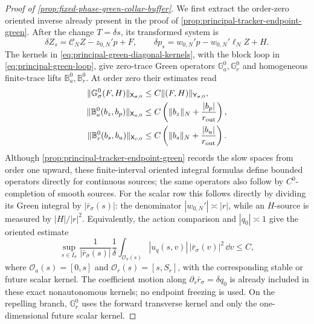 \begin{proof}[Proof of
\cref{prop:fixed-phase-green-collar-buffer}]
We first extract the order-zero oriented inverse already present in the proof
of \cref{prop:principal-tracker-endpoint-green}.  After the change
\(T=\delta s\), its transformed system is
\begin{equation}
 \delta Z_s=\mathcal C_NZ-z_{0,N}'p+F,\qquad
 \delta p_s=w_{0,N}'p-w_{0,N}'\ell_NZ+H.           \label{eq:fixed-phase-principal-s-system}
\end{equation}
The kernels in
\cref{eq:principal-green-diagonal-kernels}, with the block loop in
\cref{eq:principal-green-loop}, give zero-trace Green operators
\(\mathbb G_a^0,\mathbb G_r^0\) and homogeneous finite-trace lifts
\(\mathbb B_a^0,\mathbb B_r^0\).  At order zero their estimates read
\begin{align}
 \|\mathbb G_\sigma^0(F,H)\|_{\mathsf X_{\sigma,0}}
 &\le C\|(F,H)\|_{\mathsf Y_{\sigma,0}},\notag\\
 \|\mathbb B_a^0(b_z,b_p)\|_{\mathsf X_{a,0}}
 &\le C\left(\|b_z\|_N+\frac{|b_p|}{r_{\rm out}}\right),\notag\\
 \|\mathbb B_r^0(b_s,b_u)\|_{\mathsf X_{r,0}}
 &\le C\left(\|b_s\|_N+\frac{|b_u|}{r_{\rm out}}\right).    \label{eq:fixed-phase-principal-C0-bound}
\end{align}
Although \cref{prop:principal-tracker-endpoint-green} records the slow
spaces from order one upward, these finite-interval oriented integral
formulas define bounded operators directly for continuous sources; the same
operators also follow by \(C^0\)-completion of smooth sources.
For the scalar row this follows directly by dividing its Green integral by
\(|\bar r_\sigma(s)|\): the denominator
\(|w_{0,N}'|\asymp|r|\), while an \(H\)-source is measured by
\(|H|/|r|^2\).  Equivalently, the action comparison and
\(|q_0|\asymp1\) give the oriented estimate
\begin{equation}
 \sup_{s\in I_\sigma}\frac1{|\bar r_\sigma(s)|}
 \frac1\delta\int_{\mathcal O_\sigma(s)}
 |u_q(s,v)|\,|\bar r_\sigma(v)|^2\,\dd v\le C,    \label{eq:fixed-phase-moving-scalar-weight}
\end{equation}
where \(\mathcal O_a(s)=[0,s]\) and
\(\mathcal O_r(s)=[s,S_r]\), with the corresponding stable or future
scalar kernel.  The coefficient motion along
\(\partial_s\bar r_\sigma=\delta q_0\) is already included in these exact
nonautonomous kernels; no endpoint freezing is used.  On the repelling
branch, \(\mathbb G_r^0\) uses the forward transverse kernel and only the
one-dimensional future scalar kernel.


\end{proof}
